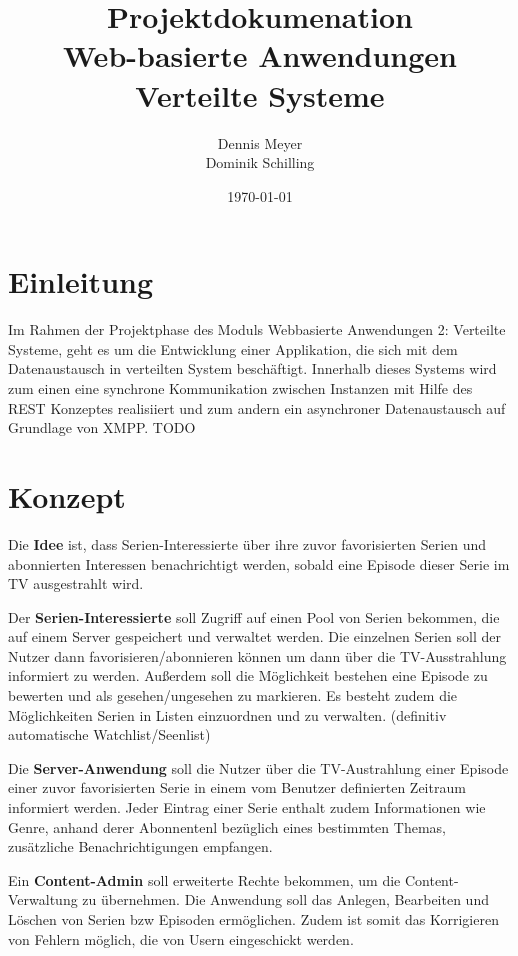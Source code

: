 \documentclass[a4paper]{article}
\title{Projektdokumenation\\Web-basierte Anwendungen\\Verteilte Systeme}
\author{Dennis Meyer\\Dominik Schilling}
\date{\today}
\begin{document}
\maketitle

\newpage

\tableofcontents

\newpage


\section{Einleitung}
Im Rahmen der Projektphase des Moduls Webbasierte Anwendungen 2: Verteilte Systeme, geht es um die Entwicklung einer Applikation, die sich mit dem Datenaustausch in verteilten System beschäftigt. Innerhalb dieses Systems wird zum einen eine synchrone Kommunikation zwischen Instanzen mit Hilfe des REST Konzeptes realisiiert und zum andern ein asynchroner Datenaustausch auf Grundlage von XMPP. TODO


\section{Konzept}

Die \textbf{Idee} ist, dass Serien-Interessierte über ihre zuvor favorisierten Serien und abonnierten Interessen benachrichtigt werden, sobald eine Episode dieser Serie im TV ausgestrahlt wird.

\parskip 12pt
\parindent 0pt
Der \textbf{Serien-Interessierte} soll Zugriff auf einen Pool von Serien bekommen, die auf einem Server gespeichert und verwaltet werden.
Die einzelnen Serien soll der Nutzer dann favorisieren/abonnieren können um dann über die TV-Ausstrahlung informiert zu werden.
Außerdem soll die Möglichkeit bestehen eine Episode zu bewerten und als gesehen/ungesehen zu markieren. Es besteht zudem die Möglichkeiten Serien in Listen einzuordnen und zu verwalten. (definitiv automatische Watchlist/Seenlist)

\parskip 12pt
\parindent 0pt
Die \textbf{Server-Anwendung} soll die Nutzer über die TV-Austrahlung einer Episode einer zuvor favorisierten Serie in einem vom Benutzer definierten Zeitraum informiert werden. Jeder Eintrag einer Serie enthalt zudem Informationen wie Genre, anhand derer Abonnentenl bezüglich eines bestimmten Themas, zusätzliche Benachrichtigungen empfangen.

\parskip 12pt
\parindent 0pt
Ein \textbf{Content-Admin} soll erweiterte Rechte bekommen, um die Content-Verwaltung zu übernehmen. Die Anwendung soll das Anlegen, Bearbeiten und Löschen von Serien bzw Episoden ermöglichen. Zudem ist somit das Korrigieren von Fehlern möglich, die von Usern eingeschickt werden.
\end{document}
